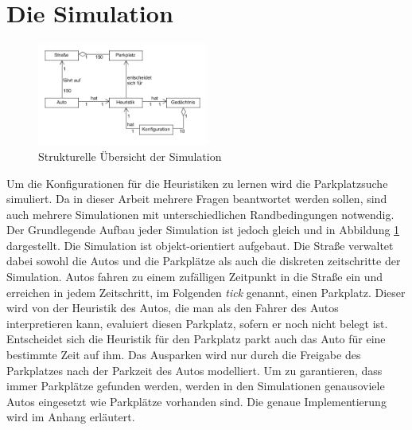 \section{Die Simulation}
\begin{figure}
\includegraphics[width=0.5\textwidth]{uml/simOverview.png}
\caption{Strukturelle Übersicht der Simulation}\label{fig_simOver}
\end{figure}
Um die Konfigurationen für die Heuristiken zu lernen wird die Parkplatzsuche simuliert. Da in dieser Arbeit mehrere Fragen beantwortet werden sollen, sind auch mehrere Simulationen mit unterschiedlichen Randbedingungen notwendig. Der Grundlegende Aufbau jeder Simulation ist jedoch gleich und in Abbildung \ref{fig_simOver} dargestellt. Die Simulation ist objekt-orientiert aufgebaut. Die Straße verwaltet dabei sowohl die Autos und die Parkplätze als auch die diskreten zeitschritte der Simulation. Autos fahren zu einem zufälligen Zeitpunkt in die Straße ein und erreichen in jedem Zeitschritt, im Folgenden \emph{tick} genannt, einen Parkplatz. Dieser wird von der Heuristik des Autos, die man als den Fahrer des Autos interpretieren kann, evaluiert diesen Parkplatz, sofern er noch nicht belegt ist. Entscheidet sich die Heuristik für den Parkplatz parkt auch das Auto für eine bestimmte Zeit auf ihm. Das Ausparken wird nur durch die Freigabe des Parkplatzes nach der Parkzeit des Autos modelliert. Um zu garantieren, dass immer Parkplätze gefunden werden, werden in den Simulationen genausoviele Autos eingesetzt wie Parkplätze vorhanden sind. Die genaue Implementierung wird im Anhang erläutert.

